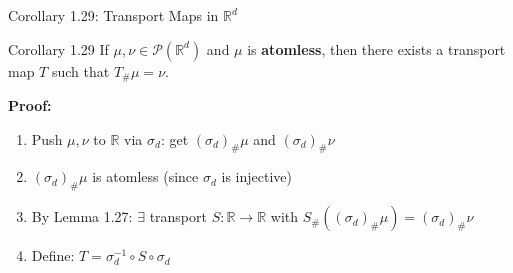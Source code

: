 \documentclass[aspectratio=169]{beamer}
\newcommand{\R}{\mathbb{R}}
\newcommand{\Pp}{\mathcal{P}}
\begin{document}
\begin{frame}{Corollary 1.29: Transport Maps in $\R^d$}
\begin{block}{Corollary 1.29}
If $\mu, \nu \in \Pp(\R^d)$ and $\mu$ is \textbf{atomless}, then there exists a transport map $T$ such that $T_\# \mu = \nu$.
\end{block}

\vspace{0.3cm}
\textbf{Proof:}
\begin{enumerate}
    \item Push $\mu, \nu$ to $\R$ via $\sigma_d$: get $(\sigma_d)_\# \mu$ and $(\sigma_d)_\# \nu$
    \item $(\sigma_d)_\# \mu$ is atomless (since $\sigma_d$ is injective)
    \item By Lemma 1.27: $\exists$ transport $S : \R \to \R$ with $S_\# ((\sigma_d)_\# \mu) = (\sigma_d)_\# \nu$
    \item Define: $T = \sigma_d^{-1} \circ S \circ \sigma_d$
\end{enumerate}

\begin{center}
\end{center}
\end{frame}
\end{document}
